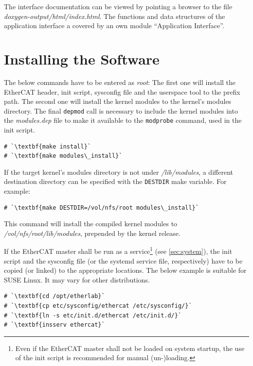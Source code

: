 \documentclass[a4paper,12pt,BCOR6mm,bibtotoc,idxtotoc]{scrbook}
\begin{document}
The interface documentation can be viewed by pointing a browser to the file
\textit{doxygen-output/html/index.html}. The functions and data structures of
the application interface a covered by an own module ``Application
Interface''.

\section{Installing the Software}

The below commands have to be entered as \textit{root}: The first one will
install the EtherCAT header, init script, sysconfig file and the userspace
tool to the prefix path. The second one will install the kernel modules to the
kernel's modules directory. The final \lstinline+depmod+ call is necessary to
include the kernel modules into the \textit{modules.dep} file to make it
available to the \lstinline+modprobe+ command, used in the init script.

\begin{lstlisting}
# `\textbf{make install}`
# `\textbf{make modules\_install}`
\end{lstlisting}

If the target kernel's modules directory is not under \textit{/lib/modules}, a
different destination directory can be specified with the \lstinline+DESTDIR+
make variable. For example:

\begin{lstlisting}
# `\textbf{make DESTDIR=/vol/nfs/root modules\_install}`
\end{lstlisting}

This command will install the compiled kernel modules to
\textit{/vol/nfs/root/lib/modules}, prepended by the kernel release.

If the EtherCAT master shall be run as a service\footnote{Even if the EtherCAT
master shall not be loaded on system startup, the use of the init script is
recommended for manual (un-)loading.} (see \autoref{sec:system}), the init
script and the sysconfig file (or the systemd service file, respectively) have
to be copied (or linked) to the appropriate locations. The below example is
suitable for SUSE Linux. It may vary for other distributions.

\begin{lstlisting}
# `\textbf{cd /opt/etherlab}`
# `\textbf{cp etc/sysconfig/ethercat /etc/sysconfig/}`
# `\textbf{ln -s etc/init.d/ethercat /etc/init.d/}`
# `\textbf{insserv ethercat}`
\end{lstlisting}
\end{document}
